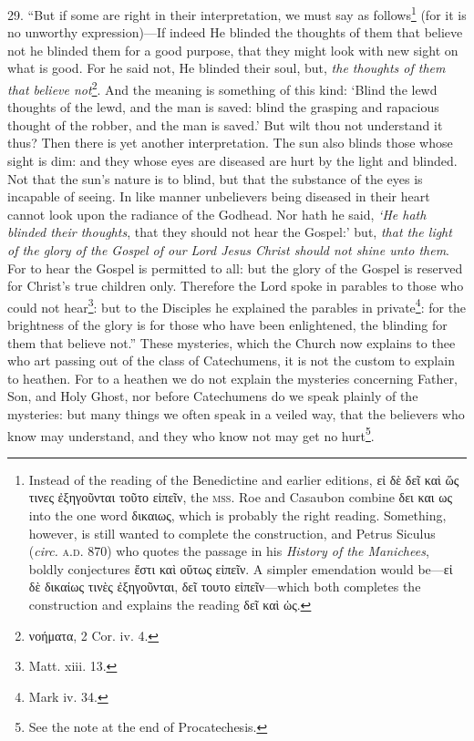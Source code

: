 29. “But if some are right in their interpretation, we must say as follows\footnote{Instead of the reading of the Benedictine and earlier editions, \textgreek{εἰ δὲ δεῖ καὶ ὥς τινες ἐξηγοῦνται τοῦτο εἰπεῖν}, the \textsc{mss.} Roe and Casaubon combine \textgreek{δει και ως} into the one word \textgreek{δικαιως}, which is probably the right reading. Something, however, is still wanted to complete the construction, and Petrus Siculus (\emph{circ.} \textsc{a.d.} 870) who quotes the passage in his \emph{History of the Manichees}, boldly conjectures \textgreek{ἔστι καὶ οὕτως εἰπεῖν}. A simpler emendation would be—\textgreek{εἰ δὲ δικαίως τινὲς ἐξηγοῦνται, δεῖ τουτο εἰπεῖν}—which both completes the construction and explains the reading \textgreek{δεῖ καὶ ὡς}.} (for it is no unworthy expression)—If indeed He blinded the thoughts of them that believe not he blinded them for a good purpose, that they might look with new sight on what is good. For he said not, He blinded their soul, but, \emph{the thoughts of them that believe not}\footnote{\textgreek{νοήματα}, 2 Cor. iv. 4.}. And the meaning is something of this kind: ‘Blind the lewd thoughts of the lewd, and the man is saved: blind the grasping and rapacious thought of the robber, and the man is saved.’ But wilt thou not understand it thus? Then there is yet another interpretation. The sun also blinds those whose sight is dim: and they whose eyes are diseased are hurt by the light and blinded. Not that the sun’s nature is to blind, but that the substance of the eyes is incapable of seeing. In like manner unbelievers being diseased in their heart cannot look upon the radiance of the Godhead. Nor hath he said, \emph{‘He hath blinded their thoughts}, that they should not hear the Gospel:’ but, \emph{that the light of the glory of the Gospel of our Lord Jesus Christ should not shine unto them}. For to hear the Gospel is permitted to all: but the glory of the Gospel is reserved for Christ’s true children only. Therefore the Lord spoke in parables to those who could not hear\footnote{Matt. xiii. 13.}: but to the Disciples he explained the parables in private\footnote{Mark iv. 34.}: for the brightness of the glory is for those who have been enlightened, the blinding for them that believe not.” These mysteries, which the Church now explains to thee who art passing out of the class of Catechumens, it is not the custom to explain to heathen. For to a heathen we do not explain the mysteries concerning Father, Son, and Holy Ghost, nor before Catechumens do we speak plainly of the mysteries: but many things we often speak in a veiled way, that the believers who know may understand, and they who know not may get no hurt\footnote{See the note at the end of Procatechesis.}.

